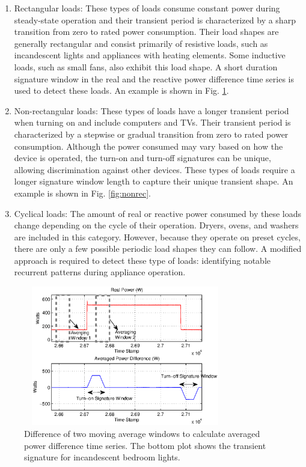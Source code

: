 \documentclass[conference]{IEEEtran}
\begin{document}
\begin{enumerate}
\item{Rectangular loads:} These types of loads consume constant power during steady-state operation and their transient period is characterized by a sharp transition from zero to rated power consumption.  Their load shapes are generally rectangular and consist primarily of resistive loads, such as incandescent lights and appliances with heating elements.  Some inductive loads, such as small fans, also exhibit this load shape.  A short duration signature window in the real and the reactive power difference time series is used to detect these loads.  An example is shown in Fig. \ref{fig:maw}.
\newline
\item{Non-rectangular loads:} These types of loads have a longer transient period when turning on and include computers and TVs.  Their transient period is characterized by a stepwise or gradual transition from zero to rated power consumption.  Although the power consumed may vary based on how the device is operated, the turn-on and turn-off signatures can be unique, allowing discrimination against other devices.  These types of loads require a longer signature window length to capture their unique transient shape.  An example is shown in Fig. \ref{fig:nonrec}.
\newline
\item{Cyclical loads:} The amount of real or reactive power consumed by these loads change depending on the cycle of their operation.  Dryers, ovens, and washers are included in this category.   However, because they operate on preset cycles, there are only a few possible periodic load shapes they can follow.  A modified approach is required to detect these type of loads: identifying notable recurrent patterns during appliance operation.
\end{enumerate}

\begin{figure}[!t]
	\centering
	\includegraphics[height = 2.4in,width=3.5in]{fig/maw2.eps}
	\caption{Difference of two moving average windows to calculate averaged power difference time series.  The bottom plot shows the transient signature for incandescent bedroom lights.}
	\label{fig:maw}
\end{figure}
\end{document}
